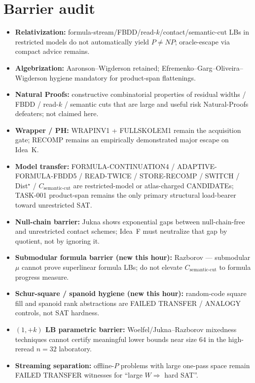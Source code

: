 \documentclass[11pt]{article}
\begin{document}
\section*{Barrier audit}
\begin{itemize}
\item \textbf{Relativization:} formula-stream/FBDD/read-$k$/contact/semantic-cut LBs in
  restricted models do not automatically yield $P\neq NP$; oracle-escape via compact advice remains.
\item \textbf{Algebrization:} Aaronson--Wigderson retained; Efremenko--Garg--Oliveira--Wigderson
  hygiene mandatory for product-span flattenings.
\item \textbf{Natural Proofs:} constructive combinatorial properties of residual widths / FBDD /
  read-$k$ / semantic cuts that are large and useful risk Natural-Proofs defeaters; not claimed here.
\item \textbf{Wrapper / PH:} WRAPINV1 + FULLSKOLEM1 remain the acquisition gate;
  RECOMP remains an empirically demonstrated major escape on Idea~K.
\item \textbf{Model transfer:} FORMULA-CONTINUATION4 / ADAPTIVE-FORMULA-FBDD5 / READ-TWICE /
  STORE-RECOMP / SWITCH / Dist$^\star$ / $C_{\mathrm{semantic\textrm{-}cut}}$ are
  restricted-model or atlas-charged CANDIDATEs; TASK-001 product-span remains the only
  primary structural load-bearer toward unrestricted SAT.
\item \textbf{Null-chain barrier:} Jukna shows exponential gaps between null-chain-free and
  unrestricted contact schemes; Idea~F must neutralize that gap by quotient, not by ignoring it.
\item \textbf{Submodular formula barrier (new this hour):} Razborov --- submodular $\mu$ cannot
  prove superlinear formula LBs; do not elevate $C_{\mathrm{semantic\textrm{-}cut}}$ to formula
  progress measure.
\item \textbf{Schur-square / spanoid hygiene (new this hour):} random-code square fill and
  spanoid rank abstractions are FAILED TRANSFER / ANALOGY controls, not SAT hardness.
\item \textbf{$(1,+k)$ LB parametric barrier:} Woelfel/Jukna--Razborov mixedness techniques
  cannot certify meaningful lower bounds near size $64$ in the high-reread $n=32$ laboratory.
\item \textbf{Streaming separation:} offline-$P$ problems with large one-pass space remain
  FAILED TRANSFER witnesses for ``large $W\Rightarrow$ hard SAT''.
\end{itemize}
\end{document}

